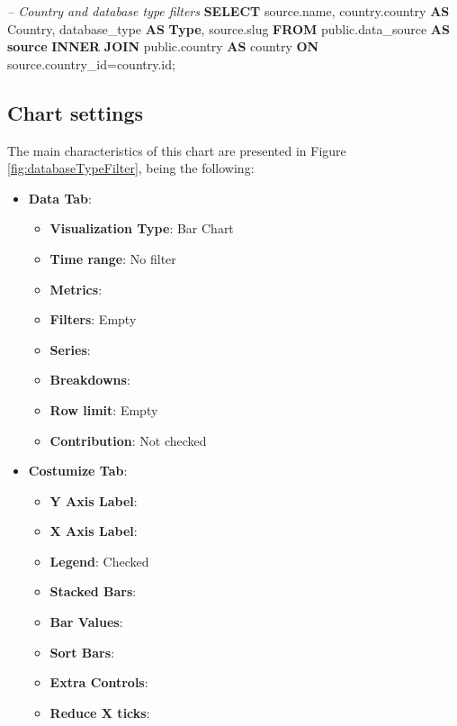 \documentclass[]{book}
\newenvironment{Shaded}{\begin{snugshade}}{\end{snugshade}}
\newcommand{\KeywordTok}[1]{\textcolor[rgb]{0.13,0.29,0.53}{\textbf{#1}}}
\newcommand{\CommentTok}[1]{\textcolor[rgb]{0.56,0.35,0.01}{\textit{#1}}}
\newcommand{\NormalTok}[1]{#1}
\providecommand{\tightlist}{%
  \setlength{\itemsep}{0pt}\setlength{\parskip}{0pt}}
\begin{document}
\begin{Shaded}
\begin{Highlighting}[]
\CommentTok{--  Country and database type filters}
\KeywordTok{SELECT}\NormalTok{ source.name, }
\NormalTok{       country.country }\KeywordTok{AS}\NormalTok{ Country, }
\NormalTok{       database_type }\KeywordTok{AS} \KeywordTok{Type}\NormalTok{,}
\NormalTok{       source.slug}
\KeywordTok{FROM}\NormalTok{ public.data_source }\KeywordTok{AS} \KeywordTok{source} \KeywordTok{INNER} \KeywordTok{JOIN}\NormalTok{ public.country }
    \KeywordTok{AS}\NormalTok{ country }\KeywordTok{ON}\NormalTok{ source.country_id=country.id;}
\end{Highlighting}
\end{Shaded}

\subsection{Chart settings}\label{chart-settings}

The main characteristics of this chart are presented in Figure
\ref{fig:databaseTypeFilter}, being the following:

\begin{itemize}
\tightlist
\item
  \textbf{Data Tab}:

  \begin{itemize}
  \tightlist
  \item
    \textbf{Visualization Type}: Bar Chart
  \item
    \textbf{Time range}: No filter
  \item
    \textbf{Metrics}:
  \item
    \textbf{Filters}: Empty
  \item
    \textbf{Series}:
  \item
    \textbf{Breakdowns}:
  \item
    \textbf{Row limit}: Empty
  \item
    \textbf{Contribution}: Not checked
  \end{itemize}
\item
  \textbf{Costumize Tab}:

  \begin{itemize}
  \tightlist
  \item
    \textbf{Y Axis Label}:
  \item
    \textbf{X Axis Label}:
  \item
    \textbf{Legend}: Checked
  \item
    \textbf{Stacked Bars}:
  \item
    \textbf{Bar Values}:
  \item
    \textbf{Sort Bars}:
  \item
    \textbf{Extra Controls}:
  \item
    \textbf{Reduce X ticks}:
  \end{itemize}
\end{itemize}
\end{document}
